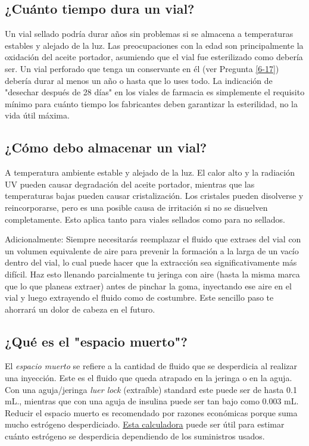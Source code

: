 \documentclass{article}
\begin{document}
\subsection{¿Cuánto tiempo dura un vial?}

Un vial sellado podría durar años sin problemas si se almacena a temperaturas estables y alejado de la luz. Las preocupaciones con la edad son principalmente la oxidación del aceite portador, asumiendo que el vial fue esterilizado como debería ser. Un vial perforado que tenga un conservante en él (ver Pregunta \ref{6-17}) debería durar al menos un año o hasta que lo uses todo. La indicación de "desechar después de 28 días" en los viales de farmacia es simplemente el requisito mínimo para cuánto tiempo los fabricantes deben garantizar la esterilidad, no la vida útil máxima.

\subsection{¿Cómo debo almacenar un vial?}\label{5-25}

A temperatura ambiente estable y alejado de la luz. El calor alto y la radiación UV pueden causar degradación del aceite portador, mientras que las temperaturas bajas pueden causar cristalización. Los cristales pueden disolverse y reincorporarse, pero es una posible causa de irritación si no se disuelven completamente. Esto aplica tanto para viales sellados como para no sellados.

Adicionalmente: Siempre necesitarás reemplazar el fluido que extraes del vial con un volumen equivalente de aire para prevenir la formación a la larga de un vacío dentro del vial, lo cual puede hacer que la extracción sea significativamente más difícil. Haz esto llenando parcialmente tu jeringa con aire (hasta la misma marca que lo que planeas extraer) antes de pinchar la goma, inyectando ese aire en el vial y luego extrayendo el fluido como de costumbre. Este sencillo paso te ahorrará un dolor de cabeza en el futuro.

\subsection{¿Qué es el "espacio muerto"?}\label{5-26}

El \textit{espacio muerto} se refiere a la cantidad de fluido que se desperdicia al realizar una inyección. Este es el fluido que queda atrapado en la jeringa o en la aguja. Con una aguja/jeringa \textit{luer lock} (extraíble) standard este puede ser de hasta 0.1 mL., mientras que con una aguja de insulina puede ser tan bajo como 0.003 mL. Reducir el espacio muerto es recomendado por razones económicas porque suma mucho estrógeno desperdiciado. \href{https://web.archive.org/web/20260307075103/https://hrtcafe.net/Calc/}{Esta calculadora} puede ser útil para estimar cuánto estrógeno se desperdicia dependiendo de los suministros usados.
\end{document}
